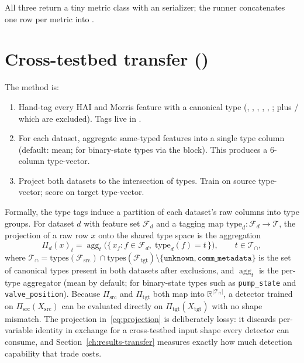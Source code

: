 All three return a tiny metric class with an  serializer; the runner concatenates one row per metric into .

\section{Cross-testbed transfer ()}

The method is:
\begin{enumerate}
  \item Hand-tag every HAI and Morris feature with a canonical type (, , , , , ; plus / which are excluded).  Tags live in .
  \item For each dataset, aggregate same-typed features into a single type column (default: mean;  for binary-state types via the  block).  This produces a 6-column type-vector.
  \item Project both datasets to the intersection of types.  Train on source type-vector; score on target type-vector.
\end{enumerate}

Formally, the type tags induce a partition of each dataset's raw columns into type groups.  For dataset $d$ with feature set $\mathcal{F}_d$ and a tagging map $\mathrm{type}_d : \mathcal{F}_d \to \mathcal{T}$, the projection of a raw row $x$ onto the shared type space is the aggregation
\begin{equation}
  \Pi_d(x)_t = \operatorname{agg}_t\bigl(\{\, x_f : f \in \mathcal{F}_d,\; \mathrm{type}_d(f) = t \,\}\bigr),
  \qquad t \in \mathcal{T}_\cap,
  \label{eq:projection}
\end{equation}
where $\mathcal{T}_\cap = \mathrm{types}(\mathcal{F}_{\mathrm{src}}) \cap \mathrm{types}(\mathcal{F}_{\mathrm{tgt}}) \setminus \{\texttt{unknown}, \texttt{comm\_metadata}\}$ is the set of canonical types present in both datasets after exclusions, and $\operatorname{agg}_t$ is the per-type aggregator (mean by default;  for binary-state types such as \texttt{pump\_state} and \texttt{valve\_position}).  Because $\Pi_{\mathrm{src}}$ and $\Pi_{\mathrm{tgt}}$ both map into $\mathbb{R}^{|\mathcal{T}_\cap|}$, a detector trained on $\Pi_{\mathrm{src}}(X_{\mathrm{src}})$ can be evaluated directly on $\Pi_{\mathrm{tgt}}(X_{\mathrm{tgt}})$ with no shape mismatch.  The projection in~\eqref{eq:projection} is deliberately lossy: it discards per-variable identity in exchange for a cross-testbed input shape every detector can consume, and Section~\ref{ch:results-transfer} measures exactly how much detection capability that trade costs.

